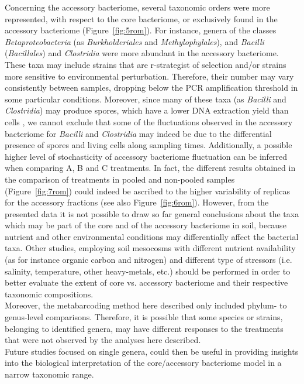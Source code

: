 Concerning the accessory bacteriome, several taxonomic orders were more represented, with respect to the core bacteriome, or exclusively found in the accessory bacteriome (Figure~\ref{fig:5rom}). For instance, genera of the classes \textit{Betaproteobacteria} (as \textit{Burkholderiales} and \textit{Methylophylales}), and \textit{Bacilli} (\textit{Bacillales}) and \textit{Clostridia} were more abundant in the accessory bacteriome. These taxa may include strains that are r-strategist of selection and/or strains more sensitive to environmental perturbation. Therefore, their number may vary consistently between samples, dropping below the PCR amplification threshold in some particular conditions. Moreover, since many of these taxa (as \textit{Bacilli} and \textit{Clostridia}) may produce spores, which have a lower DNA extraction yield than cells \cite{dineen2010evaluation}, we cannot exclude that some of the fluctuations observed in the accessory bacteriome for \textit{Bacilli} and \textit{Clostridia} may indeed be due to the differential presence of spores and living cells along sampling times. Additionally, a possible higher level of stochasticity of accessory bacteriome fluctuation can be inferred when comparing A, B and C treatments. In fact, the different results obtained in the comparison of treatments in pooled and non-pooled samples (Figure~\ref{fig:7rom}) could indeed be ascribed to the higher variability of replicas for the accessory fractions (see also Figure~\ref{fig:6rom}). However, from the presented data it is not possible to draw so far general conclusions about the taxa which may be part of the core and of the accessory bacteriome in soil, because nutrient and other environmental conditions may differentially affect the bacterial taxa. Other studies, employing soil mesocosms with different nutrient availability (as for instance organic carbon and nitrogen) and different type of  stressors (i.e. salinity, temperature, other heavy-metals, etc.) should be performed in order to better evaluate the extent of core vs. accessory bacteriome and their respective taxonomic compositions.\\
Moreover, the metabarcoding method here described only included phylum- to genus-level comparisons. Therefore, it is possible that some species or strains, belonging to identified genera, may have different responses to the treatments that were not observed by the analyses here described.\\
Future studies focused on single genera, could then be useful in providing insights into the biological interpretation of the core/accessory bacteriome model in a narrow taxonomic range.\\

